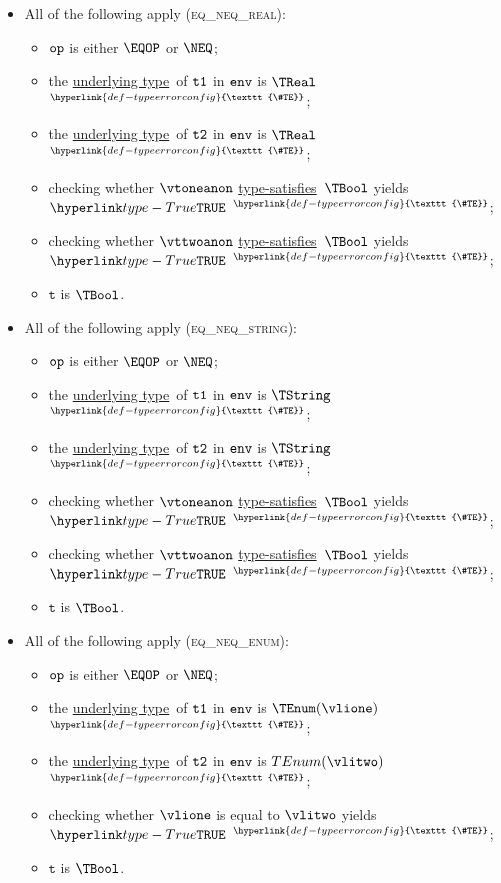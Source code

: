 \documentclass{book}
\newcommand\TypeErrorConfig[0]{\hyperlink{def-typeerrorconfig}{\texttt{\#TE}}}
\newcommand\ProseOrTypeError[0]{\hyperlink{def-proseortypeerror}{$^{\TypeErrorConfig}$}}
\newcommand\underlyingtype[0]{\hyperlink{def-underlyingtype}{underlying type}}
\newcommand\typesatisfies[0]{\hyperlink{def-typesatisfies}{type-satisfies}}
\newcommand\vt[0]{\texttt{t}}
\begin{document}
\begin{itemize}
  \item All of the following apply (\textsc{eq\_neq\_real}):
  \begin{itemize}
    \item $\texttt{op}$ is either $\EQOP$ or $\NEQ$;
    \item the \underlyingtype\ of $\texttt{t1}$ in $\texttt{env}$ is $\TReal$ \ProseOrTypeError;
    \item the \underlyingtype\ of $\texttt{t2}$ in $\texttt{env}$ is $\TReal$ \ProseOrTypeError;
    \item checking whether $\vtoneanon$ \typesatisfies\ $\TBool$ yields $\True$ \ProseOrTypeError;
    \item checking whether $\vttwoanon$ \typesatisfies\ $\TBool$ yields $\True$ \ProseOrTypeError;
    \item $\vt$ is $\TBool$.
  \end{itemize}

  \item All of the following apply (\textsc{eq\_neq\_string}):
  \begin{itemize}
    \item $\texttt{op}$ is either $\EQOP$ or $\NEQ$;
    \item the \underlyingtype\ of $\texttt{t1}$ in $\texttt{env}$ is $\TString$ \ProseOrTypeError;
    \item the \underlyingtype\ of $\texttt{t2}$ in $\texttt{env}$ is $\TString$ \ProseOrTypeError;
    \item checking whether $\vtoneanon$ \typesatisfies\ $\TBool$ yields $\True$ \ProseOrTypeError;
    \item checking whether $\vttwoanon$ \typesatisfies\ $\TBool$ yields $\True$ \ProseOrTypeError;
    \item $\vt$ is $\TBool$.
  \end{itemize}

  \item All of the following apply (\textsc{eq\_neq\_enum}):
  \begin{itemize}
    \item $\texttt{op}$ is either $\EQOP$ or $\NEQ$;
    \item the \underlyingtype\ of $\texttt{t1}$ in $\texttt{env}$ is $\TEnum(\vlione)$ \ProseOrTypeError;
    \item the \underlyingtype\ of $\texttt{t2}$ in $\texttt{env}$ is $\\TEnum(\vlitwo)$ \ProseOrTypeError;
    \item checking whether $\vlione$ is equal to $\vlitwo$ yields $\True$ \ProseOrTypeError;
    \item $\vt$ is $\TBool$.
  \end{itemize}


\end{itemize}
\end{document}
